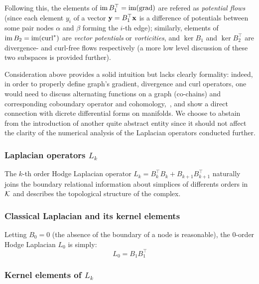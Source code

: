 Following this, the elements of \( \operatorname{im} B_1^\top = \operatorname{im} ( \operatorname*{\mathrm{grad}} )\) are refered as \emph{potential flows} (since each element \( y_i\) of a vector \( \mathbf{y} = B_1^\top \mathbf{x} \) is a difference of potentials between some pair nodes \( \alpha \) and \( \beta \) forming the \(i\)-th edge); similarly, elements of \( \operatorname{im} B_2 = \operatorname{im}( \operatorname*{\mathrm{curl}}^*)\) are \emph{vector potentials} or \emph{vorticities}, and \( \ker B_1 \) and \( \ker B_2^\top \) are divergence- and curl-free flows respectively (a more low level discussion of these two subspaces is provided further).

\begin{remark}
      Consideration above provides a solid intuition but lacks clearly formality: indeed, in order to properly define graph's gradient, divergence and curl operators, one would need to discuss alternating functions on a graph (co-chains) and corresponding coboundary operator and cohomology,~\cite{limHodgeLaplaciansGraphs2020}, and show a direct connection with dicrete differential forms on manifolds. We choose to abstain from the introduction of another quite abstract entity since it should not affect the clarity of the numerical analysis of the Laplacian operators conducted further.
\end{remark}







\subsubsection{ Laplacian operators \( L_k \) }

The \(k\)-th order Hodge Laplacian operator \( L_k = B_k^\top B_k + B_{k+1} B_{k+1}^\top \) naturally joins the boundary relational information about simplices of differents orders in \( \mathcal{K} \) and describes the topological structure of the complex.

\subsubsection{ Classical Laplacian and its kernel elements }

Letting \( B_0 = 0 \) (the absence of the boundary of a node is reasonable), the \(0\)-order Hodge Laplacian \( L_0 \) is simply:
\begin{equation}
      L_0 = B_1 B_1^\top
\end{equation}


\subsubsection{ Kernel elements of \( L_k \) }

